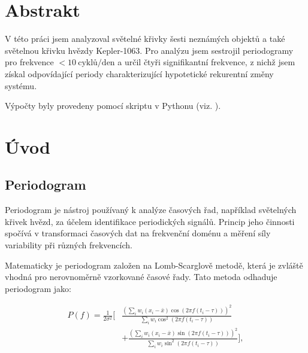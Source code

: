 \documentclass[a4paper,11pt,twocolumn]{article}
\begin{document}

    \vskip10pt

    \section{Abstrakt}
        V této práci jsem analyzoval světelné křivky šesti neznámých objektů a také světelnou křivku hvězdy Kepler-1063. Pro analýzu jsem sestrojil periodogramy pro frekvence $< 10 ~\text{cyklů/den}$ a určil čtyři signifikantní frekvence, z nichž jsem získal odpovídající periody charakterizující hypotetické rekurentní změny systému. 
        
        Výpočty byly provedeny pomocí skriptu v Pythonu (viz. \citet{github}).

    \section{Úvod}
        \subsection{Periodogram}
            Periodogram je nástroj používaný k analýze časových řad, například světelných křivek hvězd, za účelem identifikace periodických signálů. Princip jeho činnosti spočívá v transformaci časových dat na frekvenční doménu a měření síly variability při různých frekvencích.

            Matematicky je periodogram založen na Lomb-Scarglově metodě, která je zvláště vhodná pro nerovnoměrně vzorkované časové řady. Tato metoda odhaduje periodogram jako:
            
            \begin{equation*}
                \begin{aligned}
                    P(f) = \frac{1}{2\sigma^2} \Bigg[ 
                    &\frac{\left( \sum_{i} w_i (x_i - \bar{x}) \cos(2\pi f (t_i - \tau)) \right)^2}
                    {\sum_{i} w_i \cos^2(2\pi f (t_i - \tau))} \\
                    &+ 
                    \frac{\left( \sum_{i} w_i (x_i - \bar{x}) \sin(2\pi f (t_i - \tau)) \right)^2}
                    {\sum_{i} w_i \sin^2(2\pi f (t_i - \tau))} 
                    \Bigg],
                \end{aligned}
            \end{equation*}
\end{document}
